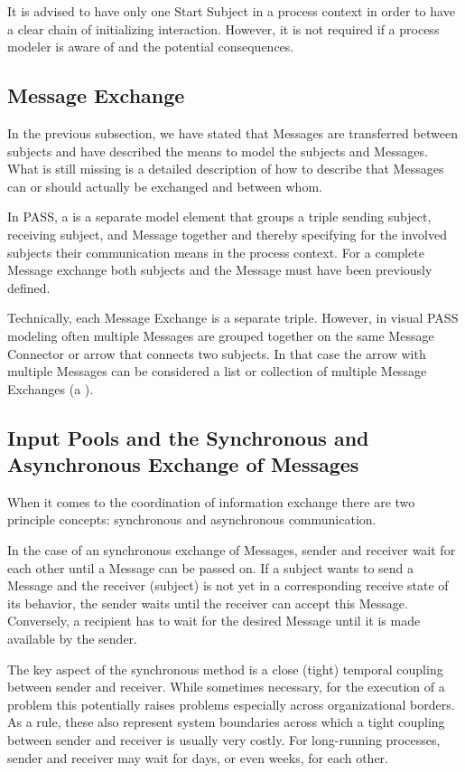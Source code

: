 It is advised to have only one Start Subject in a process context in order to have a clear chain of initializing interaction. However, it is not required if a process modeler is aware of and the potential consequences.


\subsection{Message Exchange}

In the previous subsection, we have stated that Messages are transferred between subjects and have described the means to model the subjects and Messages. What is still missing is a detailed description of how to describe that Messages can or should actually be exchanged and between whom.

In PASS, a  is a separate model element that groups a triple sending subject, receiving subject, and Message together and thereby specifying for the involved subjects their communication means in the process context. For a complete Message exchange both subjects and the Message must have been previously defined.

Technically, each Message Exchange is a separate triple. However, in visual PASS modeling often multiple Messages are grouped together on the same Message Connector or arrow that connects two subjects. In that case the arrow with multiple Messages can be considered a list or collection of multiple Message Exchanges (a ).


\subsection{Input Pools and the Synchronous and Asynchronous Exchange of Messages}
\label{sec:InputPoolRestrictions}

When it comes to the coordination of information exchange there are two principle concepts: synchronous and asynchronous communication. 

In the case of an synchronous exchange of Messages, sender and receiver wait for each other until a Message can be passed on. If a subject wants to send a Message and the receiver (subject) is not yet in a corresponding receive state of its behavior, the sender waits until the receiver can accept this Message. Conversely, a recipient has to wait for the desired Message until it is made available by the sender.

The key aspect of the synchronous method is a close (tight) temporal coupling between sender and receiver. While sometimes necessary, for the execution of a problem this potentially raises problems especially across organizational borders. As a rule, these also represent system boundaries across which a tight coupling between sender and receiver is usually very costly. For long-running processes, sender and receiver may wait for days, or even weeks, for each other.

